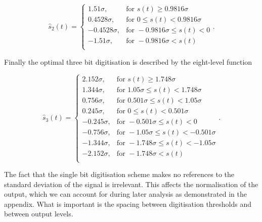 \documentclass[apj]{emulateapj}
\begin{document}
\begin{equation}  \label{eq:2bit}
\hat{s}_2(t) = \left\{ \begin{array}{rl}
1.51 \sigma, & \text{for } s(t) \geq 0.9816 \sigma\\
0.4528 \sigma, & \text{for } 0 \leq s(t) < 0.9816 \sigma\\
-0.4528 \sigma, & \text{for } -0.9816 \sigma \leq s(t) < 0\\
-1.51 \sigma, & \text{for } -0.9816 \sigma < s(t)\\
\end{array} \right. . \end{equation}

Finally the optimal three bit digitisation is described by the eight-level function

\begin{equation}  \label{eq:3bit}
\hat{s}_3(t) = \left\{ \begin{array}{rl}
2.152 \sigma, & \text{for } s(t) \geq 1.748 \sigma\\
1.344 \sigma, & \text{for } 1.05 \sigma \leq s(t) < 1.748 \sigma\\
0.756 \sigma, & \text{for } 0.501 \sigma \leq s(t) < 1.05 \sigma\\
0.245 \sigma, & \text{for } 0 \leq s(t) < 0.501 \sigma\\
-0.245 \sigma, & \text{for } -0.501 \sigma \leq s(t) < 0\\
-0.756 \sigma, & \text{for } -1.05 \sigma \leq s(t) < -0.501 \sigma\\
-1.344 \sigma, & \text{for } -1.748 \sigma \leq s(t) < -1.05 \sigma\\
-2.152 \sigma, & \text{for } -1.748 \sigma < s(t)\\
\end{array} \right. . \end{equation}

The fact that the single bit digitisation scheme makes no references to the standard deviation of the signal is irrelevant. This affects the normalisation of the output, which we can account for during later analysis as demonstrated in the appendix. What is important is the spacing between digitisation thresholds and between output levels.

\end{document}
